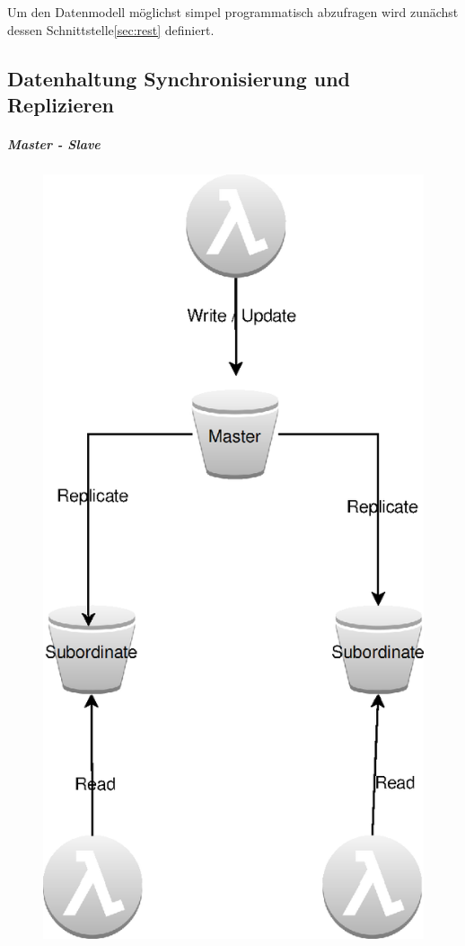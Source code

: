\documentclass[
12pt,
english,
ngerman,
headsepline,
twoside,
openright,
numbers=noenddot,version=first
]{scrreprt}
\begin{document}
Um den Datenmodell möglichst simpel programmatisch abzufragen wird zunächst dessen Schnittstelle\ref{sec:rest} definiert. 

\subsection{Datenhaltung Synchronisierung und Replizieren}
\subparagraph{Master - Slave}
\begin{figure}[H]
	\includegraphics[scale=0.2]{./pics/aws/pattern-master-subordinate-data-replication.eps}
\end{figure}
\end{document}
